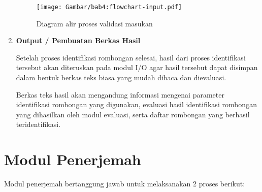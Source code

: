\begin{enumerate}
    \begin{figure}[h]
        \centering
        \texttt{[image: Gambar/bab4:flowchart-input.pdf]}
        \caption{Diagram alir proses validasi masukan}
        \label{bab4:flowchart-input}
    \end{figure}
    
    \item \textbf{Output / Pembuatan Berkas Hasil}
    
    Setelah proses identifikasi rombongan selesai, hasil dari proses identifikasi tersebut akan diteruskan pada modul I/O agar hasil tersebut dapat disimpan dalam bentuk berkas teks biasa yang mudah dibaca dan dievaluasi.
    
    Berkas teks hasil akan mengandung informasi mengenai parameter identifikasi rombongan yang digunakan, evaluasi hasil identifikasi rombongan yang dihasilkan oleh modul evaluasi, serta daftar rombongan yang berhasil teridentifikasi.
\end{enumerate}

\section{Modul Penerjemah}
\label{sec:des-parser}

Modul penerjemah bertanggung jawab untuk melaksanakan 2 proses berikut:

